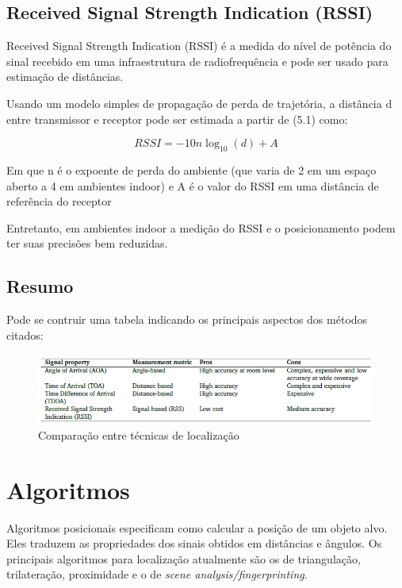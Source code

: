 \subsection{Received Signal Strength Indication (RSSI)}
Received Signal Strength Indication (RSSI) é a medida do nível de potência do sinal recebido em uma infraestrutura de radiofrequência e pode ser usado para estimação de distâncias.

Usando um modelo simples de propagação de perda de trajetória, a distância d entre transmissor e receptor pode ser estimada a partir de (5.1) como:

\begin{equation} \label{eq:rssi}
RSSI = -10n\log_{10} (d) + A 
\end{equation}

Em que n é o expoente de perda do ambiente (que varia de 2 em um espaço aberto a 4 em ambientes indoor) e A é o valor do RSSI em uma distância de referência do receptor

Entretanto, em ambientes indoor a medição do RSSI e o posicionamento podem ter suas precisões bem reduzidas. \cite{art1}

\subsection{Resumo}
Pode se contruir uma tabela indicando os principais aspectos dos métodos citados:

\begin{figure}[H]
	\centering 
	\includegraphics[scale = 1]{images/signal_table.png}
	\caption{Comparação entre técnicas de localização \cite{art1}}
	\label{fig:signal_table.png}
\end{figure}

\section{Algoritmos}

Algoritmos posicionais especificam como calcular a posição de um objeto alvo. Eles traduzem as propriedades dos sinais obtidos em distâncias e ângulos. Os principais algoritmos para localização atualmente são os de triangulação, trilateração, proximidade e o de \textit{scene analysis/fingerprinting}.


